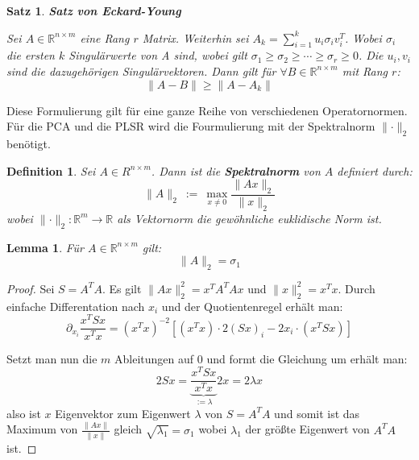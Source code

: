 \documentclass{article}
\newcommand{\R}[0]{\mathbb{R}}
\newtheorem{defin}{Definition}
\newtheorem{lemma}{Lemma}
\newtheorem{thm}{Satz}
\begin{document}
\begin{thm} \textbf{Satz von Eckard-Young}
    
    Sei $A \in \R^{n\times m}$ eine Rang $r$ Matrix. Weiterhin sei $A_k = \sum\limits_{i=1}^k u_i\sigma_iv_i^T$. 
    Wobei $\sigma_i$ die ersten $k$ Singulärwerte von A sind, wobei gilt $\sigma_1 \geq \sigma_2 \geq \cdots \geq \sigma_r \geq 0$. Die $u_i, v_i$ sind die dazugehörigen Singulärvektoren. 
    Dann gilt für $\forall B \in \R^{n \times m}$ mit Rang $r$:
    \begin{equation}
        \lVert A - B \rVert \geq \lVert A - A_k \rVert
    \end{equation}
\end{thm}

Diese Formulierung gilt für eine ganze Reihe von verschiedenen Operatornormen.
Für die PCA und die PLSR wird die Fourmulierung mit der Spektralnorm $\lVert \cdot \rVert_2$ benötigt.

\begin{defin}
    Sei $A \in R^{n \times m}$. Dann ist die \textbf{Spektralnorm} von $A$ definiert durch:
    \begin{equation}
        \lVert A \rVert_2 \: := \: \max\limits_{x \neq 0} \frac{\lVert Ax \rVert_2}{\lVert x \rVert_2}
    \end{equation}
    wobei $\lVert \cdot \rVert_2: \R^m \to \R$ als Vektornorm die gewöhnliche euklidische Norm ist.
\end{defin}

\begin{lemma}
    Für $A \in \R^{n \times m}$ gilt:
    \begin{equation}
        \lVert A \rVert_2 = \sigma_1
    \end{equation}
\end{lemma}

\begin{proof}
    Sei $S = A^TA$. Es gilt $\lVert Ax \rVert_2^2 = x^TA^TAx$ und $\lVert x \rVert_2^2 = x^Tx$.
    Durch einfache Differentation nach $x_i$ und der Quotientenregel erhält man:
    \begin{equation}
        \partial_{x_i}\frac{x^TSx}{x^Tx} = (x^Tx)^{-2}\left[ (x^Tx) \cdot 2(Sx)_i - 2x_i \cdot (x^TSx) \right]
    \end{equation}

    Setzt man nun die $m$ Ableitungen auf $0$ und formt die Gleichung um erhält man:
    \begin{equation}
        2Sx = \underbrace{\frac{x^TSx}{x^Tx}}_{:= \lambda} 2x = 2\lambda x
    \end{equation}
    also ist $x$ Eigenvektor zum Eigenwert $\lambda$ von $S = A^TA$ und
    somit ist das Maximum von $\frac{\lVert Ax \rVert}{\lVert x \rVert}$ gleich $\sqrt{\lambda_1} = \sigma_1$ wobei $\lambda_1$ der größte Eigenwert von $A^TA$ ist.
\end{proof}
\end{document}
